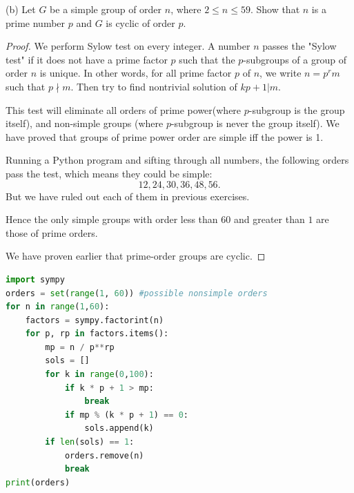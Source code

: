 (b) Let $G$ be a simple group of order $n$, where $2 \leq n \leq 59$. Show that $n$ is a prime number $p$ and $G$ is cyclic of order $p$.
\begin{proof}
	We perform Sylow test on every integer. A number $n$ passes the "Sylow test" if it does not have a prime factor  $p$ such that the $p$-subgroups of a group of order $n$ is unique. In other words, for all prime factor $p$ of $n$, we write $n = p^r m$ such that $p \nmid m$. Then try to find nontrivial solution of $kp+1 | m$. 

	This test will eliminate all orders of prime power(where $p$-subgroup is the group itself), and non-simple groups (where $p$-subgroup is never the group itself). We have proved that groups of prime power order are simple iff the power is 1.

	Running a Python program and sifting through all numbers, the following orders pass the test, which means they could be simple:
\[
	12, 24, 30, 36, 48, 56
.\] 
But we have ruled out each of them in previous exercises.

Hence the only simple groups with order less than $60$ and greater than $1$ are those of prime orders. 

We have proven earlier that prime-order groups are cyclic.
\end{proof}

\begin{lstlisting}[language=Python, caption=Python code]
import sympy
orders = set(range(1, 60)) #possible nonsimple orders
for n in range(1,60):
    factors = sympy.factorint(n)
    for p, rp in factors.items():
        mp = n / p**rp
        sols = []
        for k in range(0,100):
            if k * p + 1 > mp:
                break
            if mp % (k * p + 1) == 0:
                sols.append(k)
        if len(sols) == 1:
            orders.remove(n)
            break
print(orders)
\end{lstlisting}
